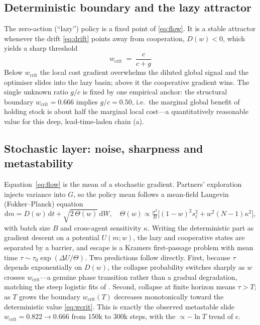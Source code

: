 \documentclass[11pt]{article}
\newcommand{\wcrit}{w_{\mathrm{crit}}}
\begin{document}
\subsection{Deterministic boundary and the lazy attractor}
The zero-action (``lazy'') policy is a fixed point of \eqref{eq:flow}. It is
a stable attractor whenever the drift \eqref{eq:drift} points away from
cooperation, $D(w)<0$, which yields a sharp threshold
\begin{equation}
  \boxed{\;\wcrit \;=\; \frac{c}{c+g}\;}
  \label{eq:wcrit}
\end{equation}
Below $\wcrit$ the local cost gradient overwhelms the diluted global
signal and the optimiser slides into the lazy basin; above it the
cooperative gradient wins. The single unknown ratio $g/c$ is fixed by one
empirical anchor: the structural boundary $\wcrit=0.666$ implies
$g/c=0.50$, i.e.\ the marginal global benefit of holding stock is about
half the marginal local cost---a quantitatively reasonable value for this
deep, lead-time-laden chain (a).

\subsection{Stochastic layer: noise, sharpness and metastability}
Equation~\eqref{eq:flow} is the mean of a stochastic gradient. Partners'
exploration injects variance into $G$, so the policy mean follows a
mean-field Langevin (Fokker--Planck) equation
\begin{equation}
  \mathrm{d}m = D(w)\,\mathrm{d}t + \sqrt{2\,\Theta(w)}\,\mathrm{d}W,
  \quad
  \Theta(w)\propto \tfrac{\sigma^2}{B}\big[(1{-}w)^2 s_\ell^2 + w^2(N{-}1)\kappa^2\big],
  \label{eq:langevin}
\end{equation}
with batch size $B$ and cross-agent sensitivity $\kappa$. Writing the
deterministic part as gradient descent on a potential $U(m;w)$, the lazy
and cooperative states are separated by a barrier, and escape is a Kramers
first-passage problem with mean time $\tau\sim\tau_0\exp(\Delta U/\Theta)$.
Two predictions follow directly. First, because $\tau$ depends
exponentially on $D(w)$, the collapse probability switches sharply as $w$
crosses $\wcrit$---a genuine phase transition rather than a gradual
degradation, matching the steep logistic fits of
. Second, collapse at finite horizon means
$\tau>T$; as $T$ grows the boundary $\wcrit(T)$ decreases monotonically
toward the deterministic value \eqref{eq:wcrit}. This is exactly the
observed metastable slide $\wcrit=0.822\!\to\!0.666$ from 150k to 300k
steps, with the $\propto-\ln T$ trend of c.
\end{document}

